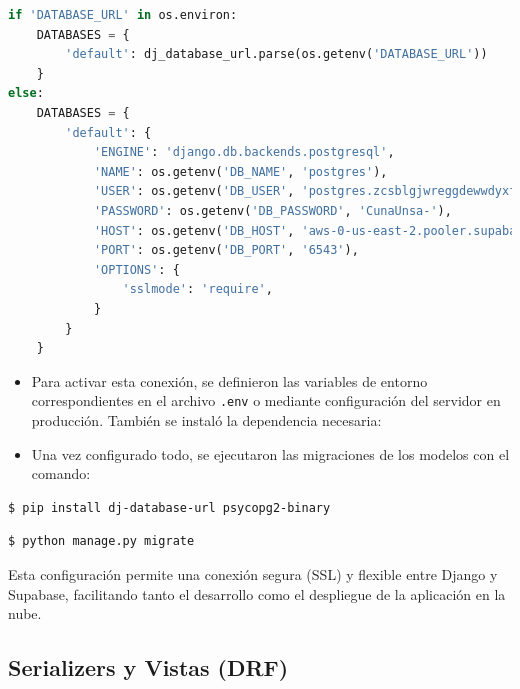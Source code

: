 \documentclass{article}
\begin{document}
        \begin{lstlisting}[language=Python, caption={Configuración de la base de datos con Supabase}]
if 'DATABASE_URL' in os.environ:
    DATABASES = {
        'default': dj_database_url.parse(os.getenv('DATABASE_URL'))
    }
else:
    DATABASES = {
        'default': {
            'ENGINE': 'django.db.backends.postgresql',
            'NAME': os.getenv('DB_NAME', 'postgres'),
            'USER': os.getenv('DB_USER', 'postgres.zcsblgjwreggdewwdyxf'),
            'PASSWORD': os.getenv('DB_PASSWORD', 'CunaUnsa-'),
            'HOST': os.getenv('DB_HOST', 'aws-0-us-east-2.pooler.supabase.com'),
            'PORT': os.getenv('DB_PORT', '6543'),
            'OPTIONS': {
                'sslmode': 'require',
            }
        }
    }
        \end{lstlisting}
        \begin{itemize}
            \item Para activar esta conexión, se definieron las variables de entorno correspondientes en el archivo \texttt{.env} o mediante configuración del servidor en producción. También se instaló la dependencia necesaria:
            \item Una vez configurado todo, se ejecutaron las migraciones de los modelos con el comando:
        \end{itemize}

        \begin{lstlisting}[language=bash, caption={Instalación de dependencias}, numbers=none]
        $ pip install dj-database-url psycopg2-binary
        \end{lstlisting}

        \begin{lstlisting}[language=bash, caption={Ejecucion de migraciones}, numbers=none]
        $ python manage.py migrate
        \end{lstlisting}

        Esta configuración permite una conexión segura (SSL) y flexible entre Django y Supabase, facilitando tanto el desarrollo como el despliegue de la aplicación en la nube.

    \subsection{Serializers y Vistas (DRF)}
\end{document}
